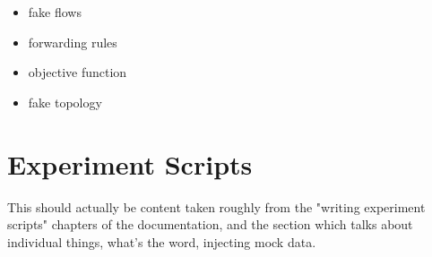 \begin{itemize}
\item fake flows
\item forwarding rules
\item objective function
\item fake topology
\end{itemize}

\section{Experiment Scripts}
This should actually be content taken roughly from the "writing experiment scripts" chapters of the documentation, and the section which talks about individual things, what's the word, injecting mock data.
